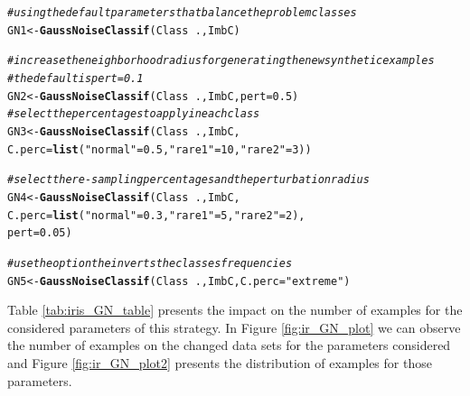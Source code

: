 \documentclass[10pt,a4paper]{article}\usepackage[]{graphicx}\usepackage[]{color}
\makeatletter
\newcommand{\hlnum}[1]{\textcolor[rgb]{0.686,0.059,0.569}{#1}}%
\newcommand{\hlstr}[1]{\textcolor[rgb]{0.192,0.494,0.8}{#1}}%
\newcommand{\hlcom}[1]{\textcolor[rgb]{0.678,0.584,0.686}{\textit{#1}}}%
\newcommand{\hlopt}[1]{\textcolor[rgb]{0,0,0}{#1}}%
\newcommand{\hlstd}[1]{\textcolor[rgb]{0.345,0.345,0.345}{#1}}%
\newcommand{\hlkwb}[1]{\textcolor[rgb]{0.69,0.353,0.396}{#1}}%
\newcommand{\hlkwc}[1]{\textcolor[rgb]{0.333,0.667,0.333}{#1}}%
\newcommand{\hlkwd}[1]{\textcolor[rgb]{0.737,0.353,0.396}{\textbf{#1}}}%
\newenvironment{kframe}{%
 \def\at@end@of@kframe{}%
 \ifinner\ifhmode%
  \def\at@end@of@kframe{\end{minipage}}%
  \begin{minipage}{\columnwidth}%
 \fi\fi%
 \def\FrameCommand##1{\hskip\@totalleftmargin \hskip-\fboxsep
 \colorbox{shadecolor}{##1}\hskip-\fboxsep
     \hskip-\linewidth \hskip-\@totalleftmargin \hskip\columnwidth}%
 \MakeFramed {\advance\hsize-\width
   \@totalleftmargin\z@ \linewidth\hsize
   \@setminipage}}%
 {\par\unskip\endMakeFramed%
 \at@end@of@kframe}
\newenvironment{knitrout}{}{} %
\makeatother
\begin{document}
\begin{knitrout}\footnotesize
{}\color{fgcolor}\begin{kframe}
\begin{alltt}
\hlcom{# using the default parameters that balance the problem classes}
\hlstd{GN1} \hlkwb{<-}\hlkwd{GaussNoiseClassif}\hlstd{(Class}\hlopt{~}\hlstd{., ImbC)}

\hlcom{# increase the neighborhood radius for generating the new synthetic examples}
\hlcom{# the default is pert = 0.1}
\hlstd{GN2} \hlkwb{<-} \hlkwd{GaussNoiseClassif}\hlstd{(Class}\hlopt{~}\hlstd{., ImbC,} \hlkwc{pert} \hlstd{=} \hlnum{0.5}\hlstd{)}
\hlcom{# select the percentages to apply in each class}
\hlstd{GN3} \hlkwb{<-} \hlkwd{GaussNoiseClassif}\hlstd{(Class}\hlopt{~}\hlstd{., ImbC,}
                         \hlkwc{C.perc} \hlstd{=} \hlkwd{list}\hlstd{(}\hlstr{"normal"} \hlstd{=} \hlnum{0.5}\hlstd{,} \hlstr{"rare1"} \hlstd{=} \hlnum{10}\hlstd{,} \hlstr{"rare2"} \hlstd{=} \hlnum{3}\hlstd{))}

\hlcom{#select the re-sampling percentages and the perturbation radius }
\hlstd{GN4} \hlkwb{<-} \hlkwd{GaussNoiseClassif}\hlstd{(Class}\hlopt{~}\hlstd{., ImbC,}
                         \hlkwc{C.perc} \hlstd{=} \hlkwd{list}\hlstd{(}\hlstr{"normal"} \hlstd{=} \hlnum{0.3}\hlstd{,} \hlstr{"rare1"} \hlstd{=} \hlnum{5}\hlstd{,} \hlstr{"rare2"} \hlstd{=} \hlnum{2}\hlstd{),}
                         \hlkwc{pert} \hlstd{=} \hlnum{0.05}\hlstd{)}

\hlcom{# use the option the inverts the classes frequencies}
\hlstd{GN5} \hlkwb{<-} \hlkwd{GaussNoiseClassif}\hlstd{(Class}\hlopt{~}\hlstd{., ImbC,} \hlkwc{C.perc}\hlstd{=}\hlstr{"extreme"}\hlstd{)}
\end{alltt}
\end{kframe}
\end{knitrout}



Table \ref{tab:iris_GN_table} presents the impact on the number of examples for the considered parameters of this strategy. In Figure \ref{fig:ir_GN_plot} we can observe the number of examples on the changed data sets for the parameters considered and Figure \ref{fig:ir_GN_plot2} presents the distribution of examples for those parameters.
\end{document}
